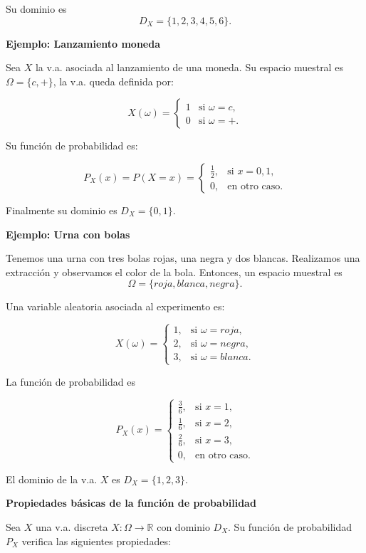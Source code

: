 \documentclass[
  letterpaper,
  DIV=11,
  numbers=noendperiod]{scrreprt}
\begin{document}
Su dominio es \[D_X=\{1,2,3,4,5,6\}.\]

\textbf{Ejemplo: Lanzamiento moneda}

Sea \(X\) la v.a. asociada al lanzamiento de una moneda. Su espacio
muestral es \(\Omega=\{c,+\}\), la v.a. queda definida por:

\[X(\omega)=\left\{\begin{array}{ll} 1 & \mbox{si } \omega=c, \\
0 & \mbox{si }\omega=+.\end{array}\right.\]

Su función de probabilidad es:

\[P_{X}(x)=P(X=x)=\left\{\begin{array}{ll} \frac12, & \mbox{si } x=0,1,\\
0, & \mbox{en otro caso.}\end{array}\right.\]

Finalmente su dominio es \(D_X=\{0,1\}.\)

\textbf{Ejemplo: Urna con bolas}

Tenemos una urna con tres bolas rojas, una negra y dos blancas.
Realizamos una extracción y observamos el color de la bola. Entonces, un
espacio muestral es \[\Omega=\{roja, blanca, negra\}.\]

Una variable aleatoria asociada al experimento es:

\[X(\omega)=\left\{\begin{array}{ll} 1, & \mbox{si } \omega=roja,  \\
2, & \mbox{si }\omega=negra, \\ 3, & \mbox{si } \omega=blanca. \end{array}\right.\]

La función de probabilidad es

\[P_{X}(x)=\left\{\begin{array}{ll} \frac36, & \mbox{si } x=1,\\[1ex]
\frac16, & \mbox{si } x=2,\\[1ex] \frac26, & \mbox{si } x=3,\\[1ex] 0, & \mbox{en otro
caso.}\end{array}\right.\]

El dominio de la v.a. \(X\) es \(D_X=\{1,2,3\}.\)

\textbf{Propiedades básicas de la función de probabilidad}

Sea \(X\) una v.a. discreta \(X:\Omega\to\mathbb{R}\) con dominio
\(D_X\). Su función de probabilidad \(P_{X}\) verifica las siguientes
propiedades:
\end{document}

